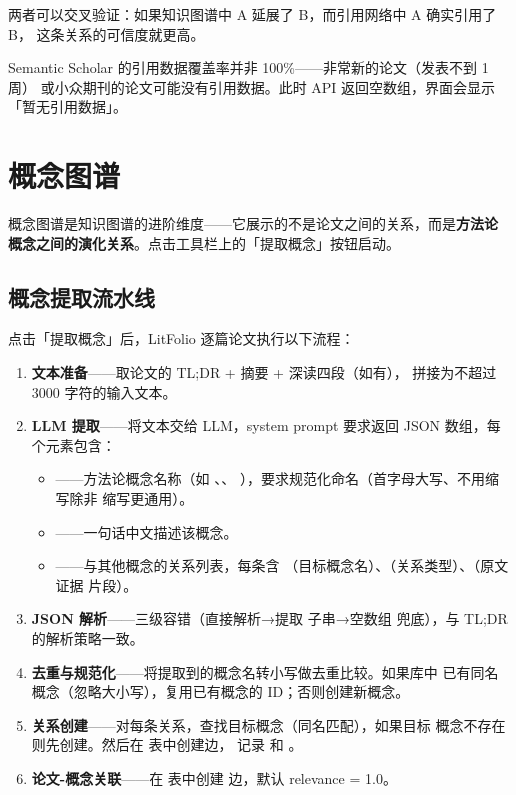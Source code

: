 两者可以交叉验证：如果知识图谱中 A 延展了 B，而引用网络中 A 确实引用了 B，
这条关系的可信度就更高。

\begin{warnbox}
Semantic Scholar 的引用数据覆盖率并非 100\%——非常新的论文（发表不到 1 周）
或小众期刊的论文可能没有引用数据。此时 API 返回空数组，界面会显示
「暂无引用数据」。
\end{warnbox}

\section{概念图谱}

概念图谱是知识图谱的进阶维度——它展示的不是论文之间的关系，而是\textbf{方法论
概念之间的演化关系}。点击工具栏上的「提取概念」按钮启动。


\subsection{概念提取流水线}

点击「提取概念」后，LitFolio 逐篇论文执行以下流程：

\begin{enumerate}
  \item \textbf{文本准备}——取论文的 TL;DR + 摘要 + 深读四段（如有），
    拼接为不超过 3000 字符的输入文本。
  \item \textbf{LLM 提取}——将文本交给 LLM，system prompt 要求返回 JSON
    数组，每个元素包含：
    \begin{itemize}
      \item {}——方法论概念名称（如 、、
        ），要求规范化命名（首字母大写、不用缩写除非
        缩写更通用）。
      \item {}——一句话中文描述该概念。
      \item {}——与其他概念的关系列表，每条含 
        （目标概念名）、（关系类型）、（原文证据
        片段）。
    \end{itemize}
  \item \textbf{JSON 解析}——三级容错（直接解析→提取 \cmd{[...]} 子串→空数组
    兜底），与 TL;DR 的解析策略一致。
  \item \textbf{去重与规范化}——将提取到的概念名转小写做去重比较。如果库中
    已有同名概念（忽略大小写），复用已有概念的 ID；否则创建新概念。
  \item \textbf{关系创建}——对每条关系，查找目标概念（同名匹配），如果目标
    概念不存在则先创建。然后在  表中创建边，
    记录  和 。
  \item \textbf{论文-概念关联}——在  表中创建
     边，默认 relevance = 1.0。
\end{enumerate}


